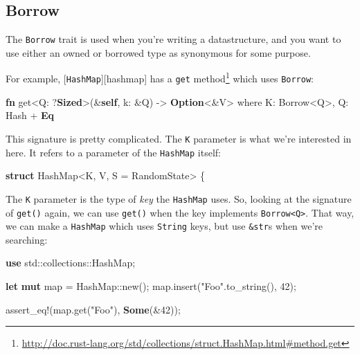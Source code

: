 \documentclass[a4paper,]{book}
\newenvironment{Shaded}{\begin{snugshade}}{\end{snugshade}}
\newcommand{\KeywordTok}[1]{\textcolor[rgb]{0.13,0.29,0.53}{\textbf{{#1}}}}
\newcommand{\DecValTok}[1]{\textcolor[rgb]{0.00,0.00,0.81}{{#1}}}
\newcommand{\StringTok}[1]{\textcolor[rgb]{0.31,0.60,0.02}{{#1}}}
\newcommand{\OtherTok}[1]{\textcolor[rgb]{0.56,0.35,0.01}{{#1}}}
\newcommand{\NormalTok}[1]{{#1}}
\renewcommand{\href}[2]{#2\footnote{\url{#1}}}
\begin{document}
\subsection{Borrow}\label{borrow}

The \texttt{Borrow} trait is used when you're writing a datastructure,
and you want to use either an owned or borrowed type as synonymous for
some purpose.

For example, {[}\texttt{HashMap}{]}{[}hashmap{]} has a
\href{http://doc.rust-lang.org/std/collections/struct.HashMap.html\#method.get}{\texttt{get}
method} which uses \texttt{Borrow}:

\begin{Shaded}
\begin{Highlighting}[]
\KeywordTok{fn} \NormalTok{get<Q: ?}\KeywordTok{Sized}\NormalTok{>(&}\KeywordTok{self}\NormalTok{, k: &Q) -> }\KeywordTok{Option}\NormalTok{<&V>}
    \NormalTok{where K: Borrow<Q>,}
          \NormalTok{Q: Hash + }\KeywordTok{Eq}
\end{Highlighting}
\end{Shaded}

This signature is pretty complicated. The \texttt{K} parameter is what
we're interested in here. It refers to a parameter of the
\texttt{HashMap} itself:

\begin{Shaded}
\begin{Highlighting}[]
\KeywordTok{struct} \NormalTok{HashMap<K, V, S = RandomState> \{}
\end{Highlighting}
\end{Shaded}

The \texttt{K} parameter is the type of \emph{key} the \texttt{HashMap}
uses. So, looking at the signature of \texttt{get()} again, we can use
\texttt{get()} when the key implements
\texttt{Borrow\textless{}Q\textgreater{}}. That way, we can make a
\texttt{HashMap} which uses \texttt{String} keys, but use
\texttt{\&str}s when we're searching:

\begin{Shaded}
\begin{Highlighting}[]
\KeywordTok{use} \NormalTok{std::collections::HashMap;}

\KeywordTok{let} \KeywordTok{mut} \NormalTok{map = HashMap::new();}
\NormalTok{map.insert(}\StringTok{"Foo"}\NormalTok{.to_string(), }\DecValTok{42}\NormalTok{);}

\OtherTok{assert_eq!}\NormalTok{(map.get(}\StringTok{"Foo"}\NormalTok{), }\KeywordTok{Some}\NormalTok{(&}\DecValTok{42}\NormalTok{));}
\end{Highlighting}
\end{Shaded}
\end{document}
